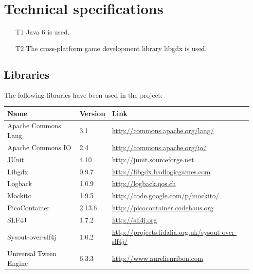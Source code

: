 \documentclass[fontsize=12pt,
               paper=a4,
               twoside=false,
               parskip=half,
               ]{scrartcl}
\begin{document}
\section{Technical specifications}
\begin{itemize}
	\item[T1] Java 6 is used.
	\item[T2] The cross-platform game development library libgdx is used. 
\end{itemize}

\subsection{Libraries}
The following libraries have been used in the project:

\begin{tabular}{| l | l | l |}
	\hline
	\textbf{Name} & \textbf{Version} & \textbf{Link} \\ \hline
	Apache Commons Lang & 3.1 & \url{http://commons.apache.org/lang/} \\ \hline
	Apache Commons IO & 2.4 & \url{http://commons.apache.org/io/} \\ \hline
	JUnit & 4.10 & \url{http://junit.sourceforge.net} \\ \hline
	Libgdx & 0.9.7 & \url{http://libgdx.badlogicgames.com} \\ \hline
	Logback & 1.0.9 & \url{http://logback.qos.ch} \\ \hline
	Mockito & 1.9.5 & \url{http://code.google.com/p/mockito/} \\ \hline
	PicoContainer & 2.13.6 & \url{http://picocontainer.codehaus.org} \\ \hline
	SLF4J & 1.7.2 & \url{http://slf4j.org} \\ \hline
	Sysout-over-slf4j & 1.0.2 & \url{http://projects.lidalia.org.uk/sysout-over-slf4j/} \\ \hline
	Universal Tween Engine & 6.3.3 & \url{http://www.aurelienribon.com} \\ \hline
\end{tabular}
\end{document}
